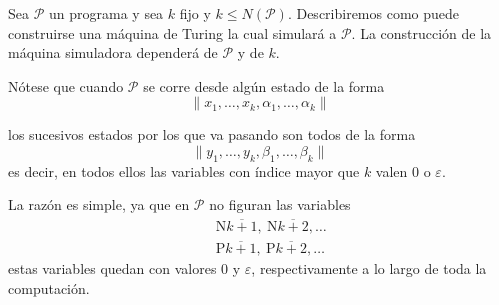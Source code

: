 \begin{frame}
	\PN Sea $\mathcal{P}$ un programa y sea $k$ fijo y $k \leq N(\mathcal{P})$. Describiremos como puede construirse una
	máquina de Turing la cual simulará a $\mathcal{P}$. La construcción de la máquina simuladora dependerá de
	$\mathcal{P}$ y de $k$.

	\PN Nótese que cuando $\mathcal{P}$ se corre desde algún estado de la forma
	\begin{equation*}
		\lVert x_{1}, \dotsc, x_{k}, \alpha_{1}, \dotsc, \alpha_{k} \rVert
	\end{equation*}

	\PN los sucesivos estados por los que va pasando son todos de la forma
	\begin{equation*}
		\lVert y_{1}, \dotsc, y_{k}, \beta_{1}, \dotsc, \beta_{k} \rVert
	\end{equation*}
	\PN es decir, en todos ellos las variables con índice mayor que $k$ valen $0$ o $\varepsilon$.

	\PN La razón es simple, ya que en $\mathcal{P}$ no figuran las variables
	\begin{eqnarray*}
		&&\mathrm{N}\overline{k+1}, \ \mathrm{N}\overline{k+2}, \dotsc \\
		&&\mathrm{P}\overline{k+1}, \ \mathrm{P}\overline{k+2}, \dotsc
	\end{eqnarray*}
	\PN estas variables quedan con valores $0$ y $\varepsilon$, respectivamente a lo largo de toda la computación.
\end{frame}
